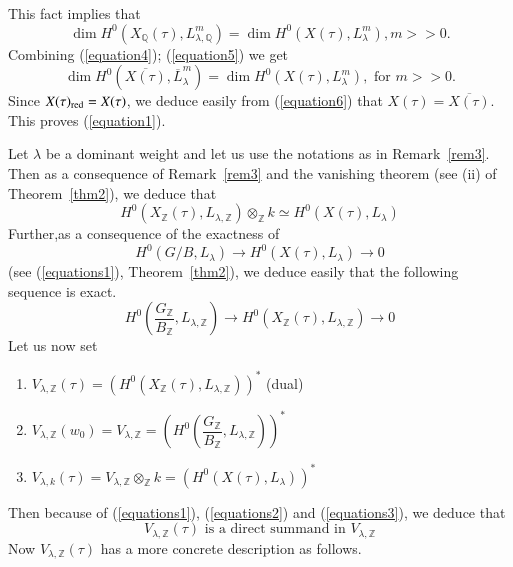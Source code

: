 \begin{rem}
This fact implies that 
\begin{equation*}\label{equation5}
\dim H^{0}\left(X_{\mathbb{Q}}(\tau), L^{m}_{\lambda, \mathbb{Q}}\right)=\dim H^{0}\left(X(\tau), L^{m}_{\lambda}\right), m>> 0. \tag{5}
\end{equation*}
Combining (\ref{equation4}); (\ref{equation5}) we get 
\begin{equation*}\label{equation6}
\dim H^{0}\left(\overline{X(\tau)}, \overline{L}^{m}_{\lambda}\right)=\dim H^{0}\left(X(\tau), L^{m}_{\lambda}\right), \text{ for } m> >0.\tag{6}
\end{equation*}
Since $X(\tau)_{\mathrm{red}}=X(\tau)$, we deduce easily from (\ref{equation6}) that $X(\tau)=\overline{X(\tau)}$. This proves (\ref{equation1}). 
\end{rem}

\begin{rem}\label{rem4}
Let $\lambda$ be a dominant weight and let us use the notations as in Remark~\ref{rem3}. Then as a consequence of Remark~\ref{rem3} and the vanishing theorem (see (ii) of Theorem~\ref{thm2}), we deduce that 
\begin{equation*}\label{equations1}
H^{0}\left(X_{\mathbb{Z}}(\tau), L_{\lambda, \mathbb{Z}}\right) \otimes_{\mathbb{Z}}k \simeq H^{0}(X(\tau), L_{\lambda})\tag{1}
\end{equation*}
Further,\pageoriginale as a consequence of the exactness of 
\begin{equation*}\label{equations2}
H^{0}(G/B,L_{\lambda})\to H^{0}(X(\tau), L_{\lambda})\to 0\tag{2}
\end{equation*}
(see (\ref{equations1}), Theorem~\ref{thm2}), we deduce easily that the following sequence is exact. 
\begin{equation*}\label{equations3}
H^{0}\left(\dfrac{G_{\mathbb{Z}}}{B_{\mathbb{Z}}}, L_{\lambda, \mathbb{Z}}\right)\to H^{0}\left(X_{\mathbb{Z}}(\tau), L_{\lambda, \mathbb{Z}}\right)\to 0\tag{3}
\end{equation*}
Let us now set 
\begin{enumerate}
\renewcommand{\theenumi}{\alph{enumi}}
\item $V_{\lambda, \mathbb{Z}}(\tau)=\left(H^{0}\left(X_{\mathbb{Z}}(\tau), L_{\lambda, \mathbb{Z}}\right)\right)^{\ast}$ (dual)
\item $V_{\lambda, \mathbb{Z}}(w_0)=V_{\lambda, \mathbb{Z}}=\left(H^{0}\left(\dfrac{G_{\mathbb{Z}}}{B_{\mathbb{Z}}}, L_{\lambda, \mathbb{Z}}\right)\right)^{\ast}$
\item $V_{\lambda, k}(\tau)=V_{\lambda, \mathbb{Z}}\otimes_{\mathbb{Z}}k = \left(H^{0}\left(X(\tau), L_{\lambda}\right)\right)^{\ast}$
\end{enumerate}
Then because of (\ref{equations1}), (\ref{equations2}) and (\ref{equations3}), we deduce that 
\begin{equation*}\label{equations4}
V_{\lambda, \mathbb{Z}}(\tau) \text{ is a direct summand in } V_{\lambda, \mathbb{Z}}\tag{4}
\end{equation*}
Now $V_{\lambda, \mathbb{Z}}(\tau)$ has a more concrete description as follows. 


\end{rem}
